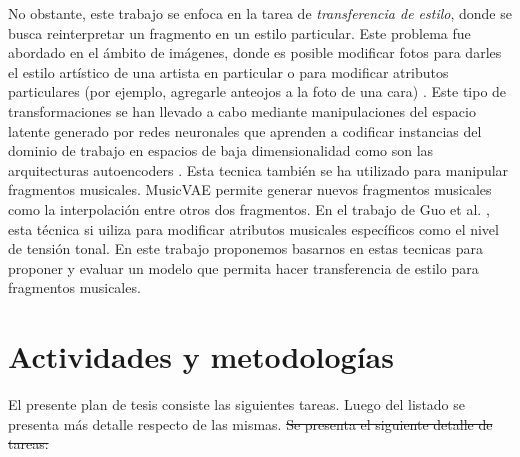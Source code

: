 \documentclass[10pt]{article}
\newcommand{\suggestM}[2]{{\color{orange} #1}{ \color{red}\sout{#2}}}
\begin{document}
No obstante, este trabajo se enfoca en la tarea de \emph{transferencia de estilo}, donde se busca reinterpretar un fragmento en un estilo particular. Este problema fue abordado en el ámbito de imágenes, donde es posible modificar fotos para darles el estilo artístico de una artista en particular \cite{gatys2015style} o para modificar atributos particulares (por ejemplo, agregarle anteojos a la foto de una cara) \cite{upchurch2016feature}. Este tipo de transformaciones se han llevado a cabo mediante manipulaciones del espacio latente generado por redes neuronales que aprenden a codificar instancias del dominio de trabajo en espacios de baja dimensionalidad como son las arquitecturas autoencoders \cite{hou2016feature}. Esta tecnica también se ha utilizado para manipular fragmentos musicales. MusicVAE \cite{roberts2019musicvae} permite generar nuevos fragmentos musicales como la interpolación entre otros dos fragmentos. En el trabajo de Guo et al. \cite{guo2020variational}, esta técnica si uiliza para modificar atributos musicales específicos como el nivel de tensión tonal. En este trabajo proponemos basarnos en estas tecnicas para proponer y evaluar un modelo que permita hacer transferencia de estilo para fragmentos musicales.
 


\section*{Actividades y metodologías}
\suggestM{El presente plan de tesis consiste las siguientes tareas. Luego del listado se presenta más detalle respecto de las mismas.}{Se presenta el siguiente detalle de tareas:}
\end{document}
